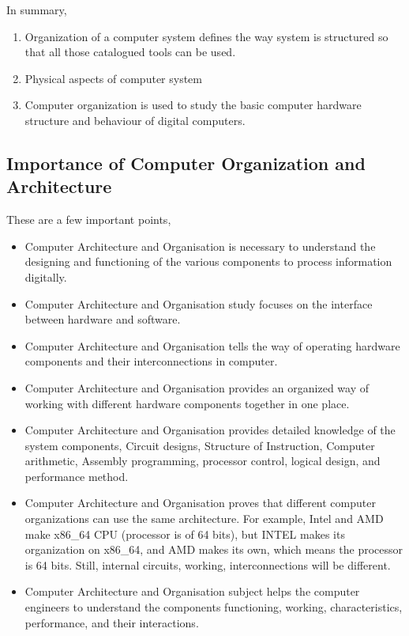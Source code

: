 \documentclass[british]{extreport}
\begin{document}
\noindent In summary,
\begin{enumerate}
	\item Organization of a computer system defines the way system is structured
	      so that all those catalogued tools can be used.
	\item Physical aspects of computer system
	\item Computer organization is used to study the basic computer hardware
	      structure and behaviour of digital computers.
\end{enumerate}

\subsection{Importance of Computer Organization and Architecture}

These are a few important points,
\begin{itemize}
	\item Computer Architecture and Organisation is necessary to understand
	      the designing and functioning of the various components to process
	      information digitally.
	\item Computer Architecture and Organisation study focuses on the interface
	      between hardware and software.
	\item Computer Architecture and Organisation tells the way of operating
	      hardware components and their interconnections in computer.
	\item Computer Architecture and Organisation provides an organized way of
	      working with different hardware components together in one place.
	\item Computer Architecture and Organisation provides detailed knowledge
	      of the system components, Circuit designs, Structure of Instruction,
	      Computer arithmetic, Assembly programming, processor control, logical
	      design, and performance method.
	\item Computer Architecture and Organisation proves that different computer
	      organizations can use the same architecture. For example, Intel and
	      AMD make x86\_64 CPU (processor is of 64 bits), but INTEL makes its
	      organization on x86\_64, and AMD makes its own, which means the processor
	      is 64 bits. Still, internal circuits, working, interconnections will
	      be different.
	\item Computer Architecture and Organisation subject helps the computer
	      engineers to understand the components functioning, working, characteristics,
	      performance, and their interactions.
\end{itemize}
\end{document}
